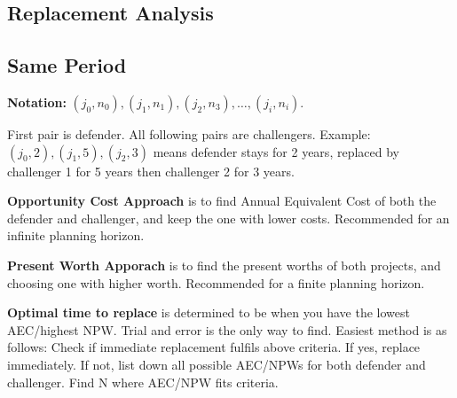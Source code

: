 \documentclass[landscape, letterpaper, 10pt]{article}
\begin{document}
\begin{multicols}{3}
    \section*{Replacement Analysis}
    \subsection*{Same Period}
    \textbf{Notation:} $(j_0, n_0), (j_1, n_1), (j_2, n_3), \ldots, (j_i, n_i)$.

    First pair is defender. All following pairs are challengers. Example: $(j_0, 2), (j_1, 5), (j_2, 3)$ means defender stays for 2 years, replaced by challenger 1 for 5 years then challenger 2 for 3 years.

    \textbf{Opportunity Cost Approach} is to find Annual Equivalent Cost of both the defender and challenger, and keep the one with lower costs. Recommended for an infinite planning horizon.

    \textbf{Present Worth Apporach} is to find the present worths of both projects, and choosing one with higher worth. Recommended for a finite planning horizon.

    \textbf{Optimal time to replace} is determined to be when you have the lowest AEC/highest NPW. Trial and error is the only way to find. Easiest method is as follows: Check if immediate replacement fulfils above criteria. If yes, replace immediately. If not, list down all possible AEC/NPWs for both defender and challenger. Find N where AEC/NPW fits criteria.

\end{multicols}
\end{document}
